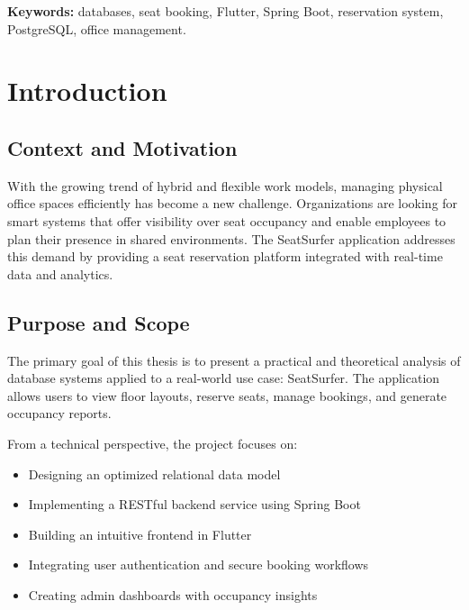 \documentclass[12pt,a4paper]{report}
\begin{document}
\vspace{0.5cm}
\noindent \textbf{Keywords:} databases, seat booking, Flutter, Spring Boot, reservation system, PostgreSQL, office management.

\newpage

\tableofcontents
\newpage

\chapter{Introduction}

\section{Context and Motivation}
With the growing trend of hybrid and flexible work models, managing physical office spaces efficiently has become a new challenge. Organizations are looking for smart systems that offer visibility over seat occupancy and enable employees to plan their presence in shared environments. The SeatSurfer application addresses this demand by providing a seat reservation platform integrated with real-time data and analytics.

\section{Purpose and Scope}
The primary goal of this thesis is to present a practical and theoretical analysis of database systems applied to a real-world use case: SeatSurfer. The application allows users to view floor layouts, reserve seats, manage bookings, and generate occupancy reports.

From a technical perspective, the project focuses on:
\begin{itemize}
    \item Designing an optimized relational data model
    \item Implementing a RESTful backend service using Spring Boot
    \item Building an intuitive frontend in Flutter
    \item Integrating user authentication and secure booking workflows
    \item Creating admin dashboards with occupancy insights
\end{itemize}
\end{document}
